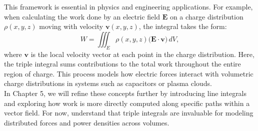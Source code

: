 \noindent This framework is essential in physics and engineering applications. For example, when calculating the work done by an electric field $\mathbf{E}$ on a charge distribution $\rho(x,y,z)$ moving with velocity $\mathbf{v}(x,y,z)$, the integral takes the form:
\[
W = \iiint_E \rho(x,y,z)\bigl(\mathbf{E} \cdot \mathbf{v}\bigr)\,dV,
\]
where $\mathbf{v}$ is the local velocity vector at each point in the charge distribution. Here, the triple integral sums contributions to the total work throughout the entire region of charge. This process models how electric forces interact with volumetric charge distributions in systems such as capacitors or plasma clouds. \\

\noindent In Chapter 5, we will refine these concepts further by introducing line integrals and exploring how work is more directly computed along specific paths within a vector field. For now, understand that triple integrals are invaluable for modeling distributed forces and power densities across volumes.

